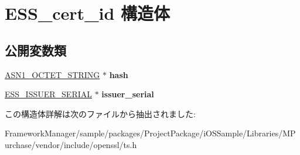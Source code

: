 \hypertarget{struct_e_s_s__cert__id}{}\section{E\+S\+S\+\_\+cert\+\_\+id 構造体}
\label{struct_e_s_s__cert__id}
\subsection*{公開変数類}
\begin{DoxyCompactItemize}
\item 
\hypertarget{struct_e_s_s__cert__id_a54fc1707932a1ce31d87b48a86bdb22a}{}\hyperlink{structasn1__string__st}{A\+S\+N1\+\_\+\+O\+C\+T\+E\+T\+\_\+\+S\+T\+R\+I\+N\+G} $\ast$ {\bfseries hash}\label{struct_e_s_s__cert__id_a54fc1707932a1ce31d87b48a86bdb22a}

\item 
\hypertarget{struct_e_s_s__cert__id_a17dc9c926a3f936f0a9417486d7a55c9}{}\hyperlink{struct_e_s_s__issuer__serial}{E\+S\+S\+\_\+\+I\+S\+S\+U\+E\+R\+\_\+\+S\+E\+R\+I\+A\+L} $\ast$ {\bfseries issuer\+\_\+serial}\label{struct_e_s_s__cert__id_a17dc9c926a3f936f0a9417486d7a55c9}

\end{DoxyCompactItemize}


この構造体詳解は次のファイルから抽出されました\+:\begin{DoxyCompactItemize}
\item 
Framework\+Manager/sample/packages/\+Project\+Package/i\+O\+S\+Sample/\+Libraries/\+M\+Purchase/vendor/include/openssl/ts.\+h\end{DoxyCompactItemize}
